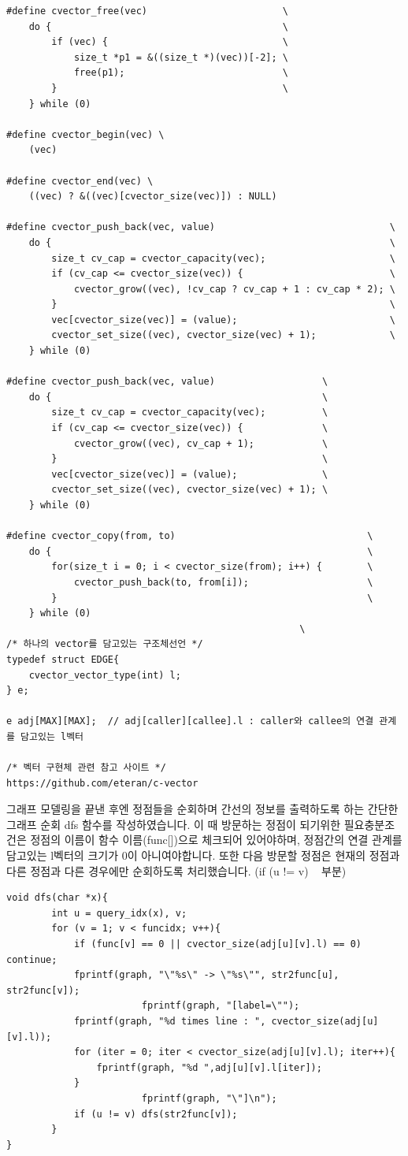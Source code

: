 \documentclass{article}
\begin{document}
\begin{verbatim}
#define cvector_free(vec)                        \
	do {                                         \
		if (vec) {                               \
			size_t *p1 = &((size_t *)(vec))[-2]; \
			free(p1);                            \
		}                                        \
	} while (0)

#define cvector_begin(vec) \
	(vec)

#define cvector_end(vec) \
	((vec) ? &((vec)[cvector_size(vec)]) : NULL)

#define cvector_push_back(vec, value)                               \
	do {                                                            \
		size_t cv_cap = cvector_capacity(vec);                      \
		if (cv_cap <= cvector_size(vec)) {                          \
			cvector_grow((vec), !cv_cap ? cv_cap + 1 : cv_cap * 2); \
		}                                                           \
		vec[cvector_size(vec)] = (value);                           \
		cvector_set_size((vec), cvector_size(vec) + 1);             \
	} while (0)

#define cvector_push_back(vec, value)                   \
	do {                                                \
		size_t cv_cap = cvector_capacity(vec);          \
		if (cv_cap <= cvector_size(vec)) {              \
			cvector_grow((vec), cv_cap + 1);            \
		}                                               \
		vec[cvector_size(vec)] = (value);               \
		cvector_set_size((vec), cvector_size(vec) + 1); \
	} while (0)

#define cvector_copy(from, to)									\
	do {														\
		for(size_t i = 0; i < cvector_size(from); i++) {		\
			cvector_push_back(to, from[i]);						\
		}														\
	} while (0)	
    												\
/* 하나의 vector를 담고있는 구조체선언 */
typedef struct EDGE{
    cvector_vector_type(int) l; 
} e;

e adj[MAX][MAX];  // adj[caller][callee].l : caller와 callee의 연결 관계를 담고있는 l벡터

/* 벡터 구현체 관련 참고 사이트 */
https://github.com/eteran/c-vector
        \end{verbatim}
        그래프 모델링을 끝낸 후엔 정점들을 순회하며 간선의 정보를 출력하도록 하는 간단한 그래프 순회 dfs 함수를 작성하였습니다. 
		이 때 방문하는 정점이 되기위한 필요충분조건은 정점의 이름이 함수 이름(func[])으로 체크되어 있어야하며, 정점간의 연결 관계를 담고있는 l벡터의 크기가 0이 아니여야합니다.
		또한 다음 방문할 정점은 현재의 정점과 다른 정점과 다른 경우에만 순회하도록 처리했습니다. (if (u != v) ~ 부분)
        \begin{verbatim}
void dfs(char *x){
        int u = query_idx(x), v;
        for (v = 1; v < funcidx; v++){
            if (func[v] == 0 || cvector_size(adj[u][v].l) == 0) continue;
            fprintf(graph, "\"%s\" -> \"%s\"", str2func[u], str2func[v]);
			            fprintf(graph, "[label=\"");
            fprintf(graph, "%d times line : ", cvector_size(adj[u][v].l));
            for (iter = 0; iter < cvector_size(adj[u][v].l); iter++){
                fprintf(graph, "%d ",adj[u][v].l[iter]);
            }
			            fprintf(graph, "\"]\n");
            if (u != v) dfs(str2func[v]);
        }
}
        \end{verbatim}
\end{document}
